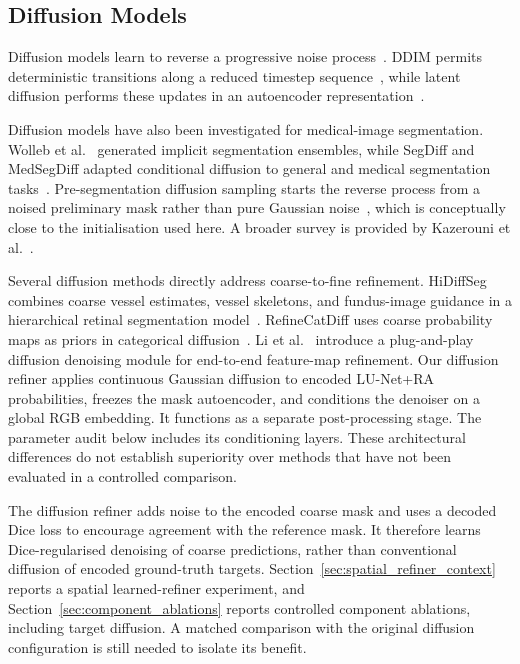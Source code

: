 \documentclass[jimaging,article,submit,pdftex,moreauthors]{Definitions/mdpi}%
\begin{document}
\subsection{Diffusion Models}



Diffusion models learn to reverse a progressive noise process~\cite{Ho2020}. DDIM permits deterministic transitions along a reduced timestep sequence~\cite{Song2021}, while latent diffusion performs these updates in an autoencoder representation~\cite{Rombach2022}.



Diffusion models have also been investigated for medical-image segmentation. Wolleb et al.~\cite{Wolleb2022} generated implicit segmentation ensembles, while SegDiff and MedSegDiff adapted conditional diffusion to general and medical segmentation tasks~\cite{SegDiff,MedSegDiff}. Pre-segmentation diffusion sampling starts the reverse process from a noised preliminary mask rather than pure Gaussian noise~\cite{PDDiffusion}, which is conceptually close to the initialisation used here. A broader survey is provided by Kazerouni et al.~\cite{Kazerouni2023}.



Several diffusion methods directly address coarse-to-fine refinement. HiDiffSeg combines coarse vessel estimates, vessel skeletons, and fundus-image guidance in a hierarchical retinal segmentation model~\cite{HiDiffSeg}. RefineCatDiff uses coarse probability maps as priors in categorical diffusion~\cite{RefineCatDiff}. Li et al.~\cite{DiffusionFMD} introduce a plug-and-play diffusion denoising module for end-to-end feature-map refinement. Our diffusion refiner applies continuous Gaussian diffusion to encoded LU-Net+RA probabilities, freezes the mask autoencoder, and conditions the denoiser on a global RGB embedding. It functions as a separate post-processing stage. The parameter audit below includes its conditioning layers. These architectural differences do not establish superiority over methods that have not been evaluated in a controlled comparison.



The diffusion refiner adds noise to the encoded coarse mask and uses a decoded Dice loss to encourage agreement with the reference mask. It therefore learns Dice-regularised denoising of coarse predictions, rather than conventional diffusion of encoded ground-truth targets. Section~\ref{sec:spatial_refiner_context} reports a spatial learned-refiner experiment, and Section~\ref{sec:component_ablations} reports controlled component ablations, including target diffusion. A matched comparison with the original diffusion configuration is still needed to isolate its benefit.
\end{document}
